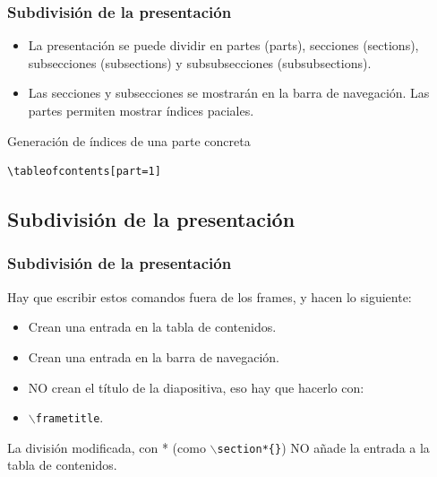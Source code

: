 \documentclass[aspectratio=43]{beamer}%
\begin{document}
\begin{frame}[fragile]
\frametitle{\textbf{Subdivisión de la presentación}}
\justifying
 
 \begin{itemize}\justifying
  \item La presentación se puede dividir en partes (parts), secciones (sections), subsecciones (subsections) y subsubsecciones (subsubsections).
  \item Las secciones y subsecciones se mostrarán en la barra de navegación. Las partes permiten mostrar índices paciales.
\end{itemize}

\begin{exampleblock}{Generación de índices de una parte concreta}
   \lstset{language=}%
   \vspace{-0.7cm}
\begin{lstlisting}
\tableofcontents[part=1]
\end{lstlisting}\vspace{-0.3cm}

\end{exampleblock}
\end{frame}

\subsection{Subdivisión de la presentación}
\begin{frame}[fragile]
\frametitle{\textbf{Subdivisión de la presentación}}
\justifying
 Hay que escribir estos comandos fuera de los frames, y hacen lo siguiente:
 \begin{itemize}\justifying
  \item Crean una entrada en la tabla de contenidos.
  \item Crean una entrada en la barra de navegación.
  \item NO crean el título de la diapositiva, eso hay que hacerlo con:
  \item [] \texttt{$\backslash$frametitle}.
\end{itemize}

La división modificada, con * (como \texttt{$\backslash$section*\{\}}) NO añade la entrada a la tabla de contenidos.
\end{frame}
\end{document}
